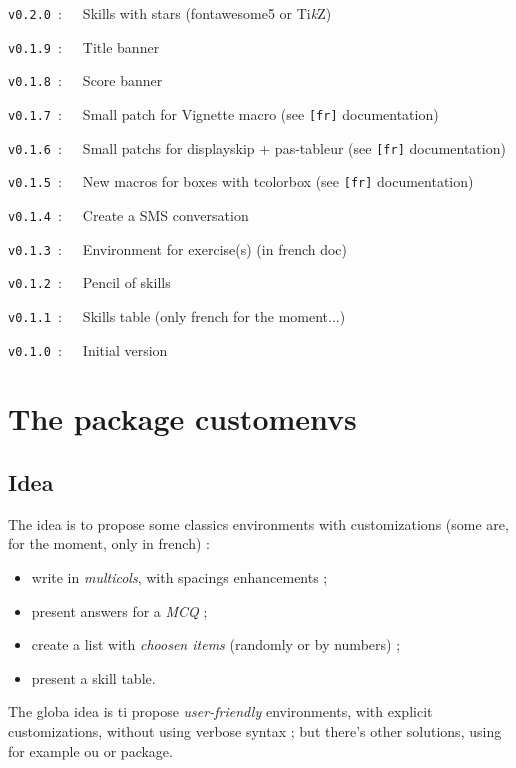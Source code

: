 \documentclass[english,11pt,a4paper]{article}
\providecommand\tikzlogo{Ti\textit{k}Z}
\let\TikZ\tikzlogo
\begin{document}
\verb|v0.2.0|~:~~~Skills with stars (\textsf{fontawesome5} or \TikZ)

\verb|v0.1.9|~:~~~Title banner

\verb|v0.1.8|~:~~~Score banner

\verb|v0.1.7|~:~~~Small patch for \textsf{Vignette} macro (see \texttt{[fr]} documentation)

\verb|v0.1.6|~:~~~Small patchs for \textsf{displayskip} + \textsf{pas-tableur} (see \texttt{[fr]} documentation)

\verb|v0.1.5|~:~~~New macros for boxes with \textsf{tcolorbox} (see \texttt{[fr]} documentation)

\verb|v0.1.4|~:~~~Create a SMS conversation

\verb|v0.1.3|~:~~~Environment for exercise(s) (in french doc)

\verb|v0.1.2|~:~~~Pencil of skills

\verb|v0.1.1|~:~~~Skills table (only french for the moment...)

\verb|v0.1.0|~:~~~Initial version

\vspace*{5mm}

\pagebreak

\section{The package customenvs}

\subsection{Idea}

The idea is to propose some classics environments with customizations (some are, for the moment, only in french) :

\begin{itemize}
	\item write in \textit{multicols}, with spacings enhancements ;
	\item present answers for a \textit{MCQ} ;
	\item create a list with \textit{choosen items} (randomly or by numbers) ;
	\item present a skill table.
\end{itemize}

\smallskip

The globa idea is ti propose \textit{user-friendly} environments, with explicit customizations, without using verbose syntax ; but there's other solutions, using for example  ou  or  package.
\end{document}
